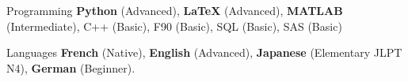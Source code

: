 

\begin{cvskills}

\cvskill
  {Programming} %
  {\textbf{Python} (Advanced), \textbf{LaTeX} (Advanced), \textbf{MATLAB} (Intermediate), {C++} (Basic), F90 (Basic), SQL (Basic), SAS (Basic)} %

\cvskill
  {Languages} %
  {\textbf{French} (Native), \textbf{English} (Advanced), \textbf{Japanese} (Elementary JLPT N4), \textbf{German} (Beginner).} %

\end{cvskills}
